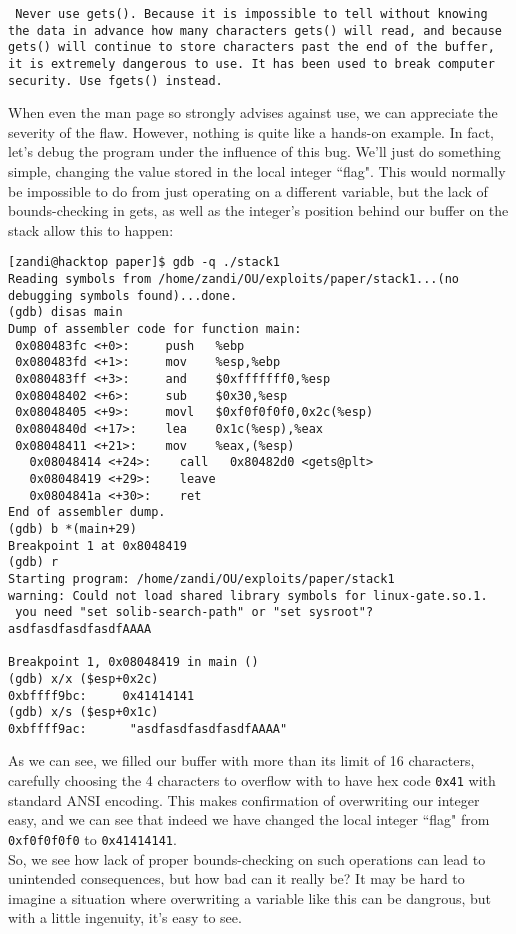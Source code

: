 \begin{sloppypar} %
\texttt{
Never use gets().  Because it is impossible to tell without knowing the
data in advance how many  characters  gets()  will  read,  and  because
gets() will continue to store characters past the end of the buffer, it
is extremely dangerous to use.  It has  been  used  to  break  computer
security.  Use fgets() instead.
}\\
\end{sloppypar}

When even the man page so strongly advises against use, we can appreciate the severity of the flaw.
However, nothing is quite like a hands-on example. In fact, let's debug the program under the influence of this bug.
We'll just do something simple, changing the value stored in the local integer ``flag". This would normally
be impossible to do from just operating on a different variable, but the lack of bounds-checking in gets, as 
well as the integer's position behind our buffer on the stack allow this to happen:

\begin{lstlisting}
[zandi@hacktop paper]$ gdb -q ./stack1
Reading symbols from /home/zandi/OU/exploits/paper/stack1...(no debugging symbols found)...done.
(gdb) disas main
Dump of assembler code for function main:
 0x080483fc <+0>:     push   %ebp
 0x080483fd <+1>:     mov    %esp,%ebp
 0x080483ff <+3>:     and    $0xfffffff0,%esp
 0x08048402 <+6>:     sub    $0x30,%esp
 0x08048405 <+9>:     movl   $0xf0f0f0f0,0x2c(%esp)
 0x0804840d <+17>:    lea    0x1c(%esp),%eax
 0x08048411 <+21>:    mov    %eax,(%esp)
   0x08048414 <+24>:    call   0x80482d0 <gets@plt>
   0x08048419 <+29>:    leave  
   0x0804841a <+30>:    ret    
End of assembler dump.
(gdb) b *(main+29)
Breakpoint 1 at 0x8048419
(gdb) r
Starting program: /home/zandi/OU/exploits/paper/stack1 
warning: Could not load shared library symbols for linux-gate.so.1.
 you need "set solib-search-path" or "set sysroot"?
asdfasdfasdfasdfAAAA

Breakpoint 1, 0x08048419 in main ()
(gdb) x/x ($esp+0x2c)
0xbffff9bc:     0x41414141
(gdb) x/s ($esp+0x1c)
0xbffff9ac:      "asdfasdfasdfasdfAAAA"
\end{lstlisting}
As we can see, we filled our buffer with more than its limit of 16 characters, carefully choosing the
4 characters to overflow with to have hex code \texttt{0x41} with standard ANSI encoding. This makes confirmation
of overwriting our integer easy, and we can see that indeed we have changed the local integer ``flag" from
\texttt{0xf0f0f0f0} to \texttt{0x41414141}.\\

So, we see how lack of proper bounds-checking on such operations can lead to unintended consequences,
but how bad can it really be? It may be hard to imagine a situation where overwriting a variable like
this can be dangrous, but with a little ingenuity, it's easy to see.\\


